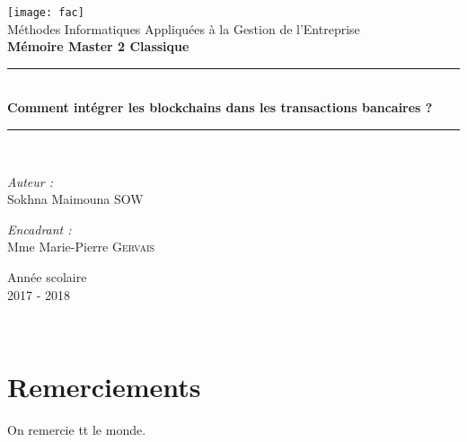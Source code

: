 \documentclass[12pt]{report}
\author{SOW Sokhna Maimouna} %
\begin{document}

\begin{titlepage}
\begin{center}

\texttt{[image: fac]}\\[1cm]

{\large Méthodes Informatiques Appliquées à la Gestion de l'Entreprise}\\[0.8cm]


{\large \textbf{Mémoire Master 2 Classique}}\\[0.5cm]

\vfill

\rule{\linewidth}{0.5mm} \\[0.4cm]
{ \huge \bfseries Comment intégrer les blockchains dans les transactions bancaires ?  \\[0.4cm] }
\rule{\linewidth}{0.5mm} \\[1.5cm]

\vfill

\noindent
\begin{minipage}{0.4\textwidth}
  \begin{flushleft} \large
    \emph{Auteur :}\\
   Sokhna Maimouna \textsc{SOW}\\
  \end{flushleft}
\end{minipage}%
\begin{minipage}{0.4\textwidth}
  \begin{flushright} \large
    \emph{Encadrant :} \\
   Mme Marie-Pierre \textsc{Gervais}\\
  \end{flushright}
\end{minipage}

\vfill

{\large Année scolaire \\ 2017 - 2018}

\end{center}
\end{titlepage}

\thispagestyle{empty}
\newpage
~

\newpage
\section{Remerciements}
\hspace{1cm} On remercie tt le monde.\\ 
\end{document}
